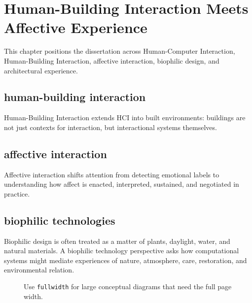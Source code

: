 \chapter{Human-Building Interaction Meets Affective Experience}\label{ch:background}


\begin{synopsis}
This chapter positions the dissertation across Human-Computer Interaction, Human-Building Interaction, affective interaction, biophilic design, and architectural experience.
\end{synopsis}

\section{human-building interaction}
 Human-Building Interaction extends HCI into built environments: buildings are not just contexts for interaction, but interactional systems themselves.

\section{affective interaction}
Affective interaction shifts attention from detecting emotional labels to understanding how affect is enacted, interpreted, sustained, and negotiated in practice.

\section{biophilic technologies}
Biophilic design is often treated as a matter of plants, daylight, water, and natural materials. A biophilic technology perspective asks how computational systems might mediate experiences of nature, atmosphere, care, restoration, and environmental relation.

\begin{figure}
\begin{fullwidth}
\centering
{}
\caption{Use \texttt{fullwidth} for large conceptual diagrams that need the full page width.}
\end{fullwidth}
\end{figure}
